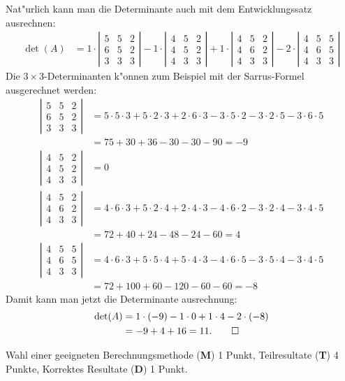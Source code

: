 \begin{loesung}
Nat"urlich kann man die Determinante auch mit dem Entwicklungssatz ausrechnen:
\begin{align*}
\det(A)
&=
1\cdot\left|\begin{matrix}
5&5&2\\
6&5&2\\
3&3&3
\end{matrix}\right|
-
1\cdot\left|\begin{matrix}
4&5&2\\
4&5&2\\
4&3&3
\end{matrix}\right|
+
1\cdot\left|\begin{matrix}
4&5&2\\
4&6&2\\
4&3&3
\end{matrix}\right|
-
2\cdot\left|\begin{matrix}
4&5&5\\
4&6&5\\
4&3&3
\end{matrix}\right|
\end{align*}
Die $3\times 3$-Determinanten k"onnen zum Beispiel mit der Sarrus-Formel
ausgerechnet werden:
\begin{align*}
\left|\begin{matrix}
5&5&2\\
6&5&2\\
3&3&3
\end{matrix}\right|
&=
5\cdot 5\cdot 3 + 5\cdot 2 \cdot3 + 2\cdot 6\cdot 3
-3\cdot 5\cdot 2-3\cdot 2\cdot 5-3\cdot 6\cdot5
\\
&=
75+30+36-30-30-90=-9
\\
\left|\begin{matrix}
4&5&2\\
4&5&2\\
4&3&3
\end{matrix}\right|
&=0
\\
\left|\begin{matrix}
4&5&2\\
4&6&2\\
4&3&3
\end{matrix}\right|
&=
4\cdot 6\cdot 3 + 5\cdot 2\cdot4+2\cdot 4\cdot 3
-4\cdot 6\cdot 2-3\cdot 2\cdot 4-3\cdot 4\cdot 5
\\
&=72+40+24-48-24-60=4
\\
\left|\begin{matrix}
4&5&5\\
4&6&5\\
4&3&3
\end{matrix}\right|
&=
4\cdot 6\cdot 3+5\cdot 5\cdot 4 +5\cdot 4\cdot 3
-4\cdot 6\cdot 5-3\cdot 5\cdot 4-3\cdot 4\cdot 5
\\
&= 72+100+60-120-60-60
=-8
\end{align*}
Damit kann man jetzt die  Determinante ausrechnung:
\begin{align*}
\det(A)
&=
1\cdot (-9)
-1\cdot 0
+1\cdot 4
-2\cdot (-8)
\\
&=-9+4+16=11.
\qedhere
\end{align*}
\end{loesung}

\begin{bewertung}
Wahl einer geeigneten Berechnungsmethode ({\bf M}) 1 Punkt,
Teilresultate ({\bf T}) 4 Punkte,
Korrektes Resultate ({\bf D}) 1 Punkt.
\end{bewertung}
